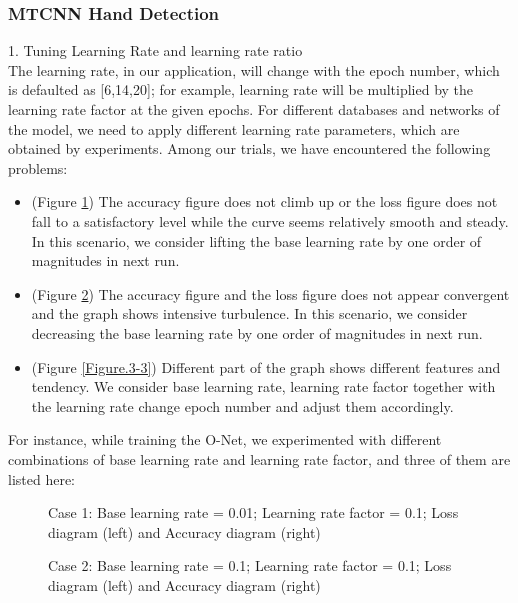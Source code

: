 \subsubsection{MTCNN Hand Detection}
1.	Tuning Learning Rate and learning rate ratio\\[.2in]
The learning rate, in our application, will change with the epoch number, which is defaulted as [6,14,20]; for example, learning rate will be multiplied by the learning rate factor at the given epochs. For different databases and networks of the model, we need to apply different learning rate parameters, which are obtained by experiments. Among our trials, we have encountered the following problems:
\begin{itemize}
    \item (Figure \ref{Figure.1-1}) The accuracy figure does not climb up or the loss figure does not fall to a satisfactory level while the curve seems relatively smooth and steady. In this scenario, we consider lifting the base learning rate by one order of magnitudes in next run.
    \item (Figure \ref{Figure.2-2}) The accuracy figure and the loss figure does not appear convergent and the graph shows intensive turbulence. In this scenario, we consider decreasing the base learning rate by one order of magnitudes in next run.
    \item (Figure \ref{Figure.3-3}) Different part of the graph shows different features and tendency. We consider base learning rate, learning rate factor together with the learning rate change epoch number and adjust them accordingly.
\end{itemize}
For instance, while training the O-Net, we experimented with different combinations of base learning rate and learning rate factor, and three of them are listed here: \\[.2in]
\begin{figure}
    \centering
      \qquad
      \label{Figure.1-1}
      \caption{Case 1: Base learning rate = 0.01; Learning rate factor = 0.1; Loss diagram (left) and Accuracy diagram (right)}
\end{figure}
\begin{figure}
    \centering
      \qquad
      \label{Figure.2-2}
      \caption{Case 2: Base learning rate = 0.1; Learning rate factor = 0.1; Loss diagram (left) and Accuracy diagram (right)}
\end{figure}

